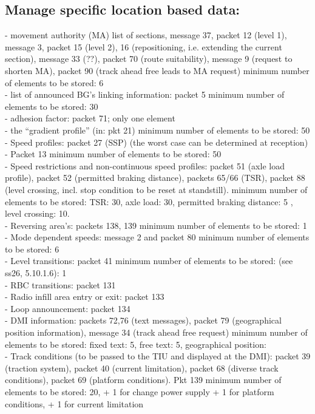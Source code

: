 \documentclass{template/openetcs_report}
\begin{document}
\subsection{Manage specific location based data:}
- movement authority (MA) list of sections, message 37, packet 12 (level 1), message 3, packet 15 (level 2), 16 (repositioning, i.e. extending the current section), message 33 (??), packet 70 (route suitability), message 9 (request to shorten MA), packet 90 (track ahead free leads to MA request)    minimum number of elements to be stored: 6\\
- list of announced \gls{BG}'s linking information: packet 5  minimum number of elements to be stored: 30\\
- adhesion factor: packet 71;  only one element\\
- the “gradient profile” (in: pkt 21)  minimum number of elements to be stored: 50\\
- Speed profiles:  packet 27 (SSP)  (the worst case can be determined at reception)\\
- Packet 13	minimum number of elements to be stored: 50\\
- Speed restrictions and non-continuous speed profiles: packet 51 (axle load profile), packet 52 (permitted braking distance), packets 65/66 (TSR), packet 88 (level crossing, incl. stop condition to be reset at standstill). 
minimum number of elements to be stored: TSR: 30, axle load: 30, permitted braking distance:  5 , level crossing: 10. \\
- Reversing area's: packets 138, 139	minimum number of elements to be stored: 1\\
- Mode dependent speeds: message 2  and packet 80  minimum number of elements to be stored: 6\\
- Level transitions: packet 41  minimum number of elements to be stored:  (see ss26, 5.10.1.6): 1\\
- RBC transitions: packet 131\\
- Radio infill area entry or exit: packet 133\\
- Loop announcement: packet 134\\
- \gls{DMI} information: packets 72,76 (text messages), packet 79 (geographical position information), message 34 (track ahead free request)  minimum number of elements to be stored: fixed text: 5, free text: 5, geographical position: \\
- Track conditions (to be passed to the TIU and displayed at the \gls{DMI}): packet 39 (traction system), packet 40 (current limitation),  packet 68 (diverse track conditions), packet 69 (platform conditions). Pkt 139  minimum number of elements to be stored: 20, + 1 for change power supply + 1 for platform conditions, + 1 for current limitation\\
\end{document}
